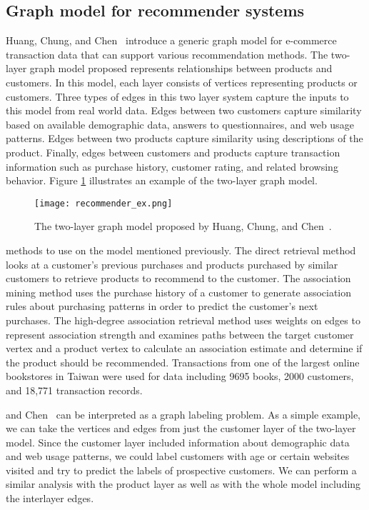 \subsection{Graph model for recommender systems} Huang, Chung, and Chen~\cite{huang2004graph}
introduce a generic graph model for e-commerce transaction data that can support various
recommendation methods. The two-layer graph model proposed represents relationships between products
and customers. In this model, each layer consists of vertices representing products or customers.
Three types of edges in this two layer system capture the inputs to this model from real world data.
Edges between two customers capture similarity based on available demographic data, answers to
questionnaires, and web usage patterns. Edges between two products capture similarity using
descriptions of the product. Finally, edges between customers and products capture transaction
information such as purchase history, customer rating, and related browsing behavior. Figure
\ref{fig:recommender_example} illustrates an example of the two-layer graph model.

\begin{figure}[h] \centering \texttt{[image: recommender\_ex.png]}
\caption{The two-layer graph model proposed by Huang, Chung, and Chen~\cite{huang2004graph}.}
\label{fig:recommender_example}
\end{figure}

methods to use on the model mentioned previously. The direct retrieval method looks at a customer's
previous purchases and products purchased by similar customers to retrieve products to recommend to
the customer. The association mining method uses the purchase history of a customer to generate
association rules about purchasing patterns in order to predict the customer's next purchases. The
high-degree association retrieval method uses weights on edges to represent association strength and
examines paths between the target customer vertex and a product vertex to calculate an association
estimate and determine if the product should be recommended. Transactions from one of the largest
online bookstores in Taiwan were used for data including 9695 books, 2000 customers, and 18,771
transaction records.

and Chen~\cite{huang2004graph} can be interpreted as a graph labeling problem. As a simple example,
we can take the vertices and edges from just the customer layer of the two-layer model. Since the
customer layer included information about demographic data and web usage patterns, we could label
customers with age or certain websites visited and try to predict the labels of prospective
customers. We can perform a similar analysis with the product layer as well as with the whole model
including the interlayer edges.

